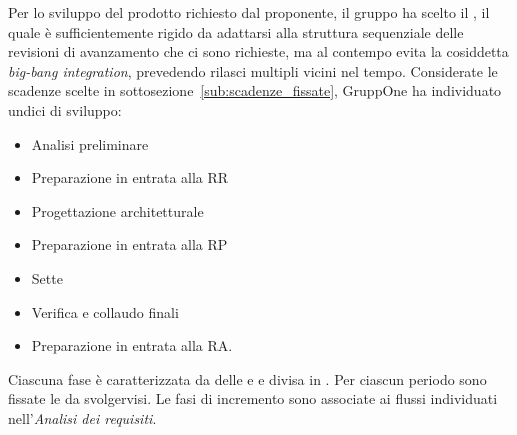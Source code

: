 \documentclass[../piano-di-progetto.tex]{subfiles}
\begin{document}
Per lo sviluppo del prodotto richiesto dal proponente, il gruppo ha scelto il , il quale è sufficientemente rigido da adattarsi alla struttura sequenziale delle revisioni di avanzamento che ci sono richieste, ma al contempo evita la cosiddetta \textit{big-bang integration}, prevedendo rilasci multipli vicini nel tempo.
Considerate le scadenze scelte in sottosezione~\ref{sub:scadenze_fissate}, GruppOne ha individuato undici  di sviluppo:
\begin{itemize}
  \item Analisi preliminare
  \item Preparazione in entrata alla RR
  \item Progettazione architetturale
  \item Preparazione in entrata alla RP
  \item Sette 
  \item Verifica e collaudo finali
  \item Preparazione in entrata alla RA\@.
\end{itemize}
Ciascuna fase è caratterizzata da delle  e  e divisa in .
Per ciascun periodo sono fissate le  da svolgervisi. Le fasi di incremento sono associate ai flussi individuati nell'\textit{Analisi dei requisiti}.
\end{document}
